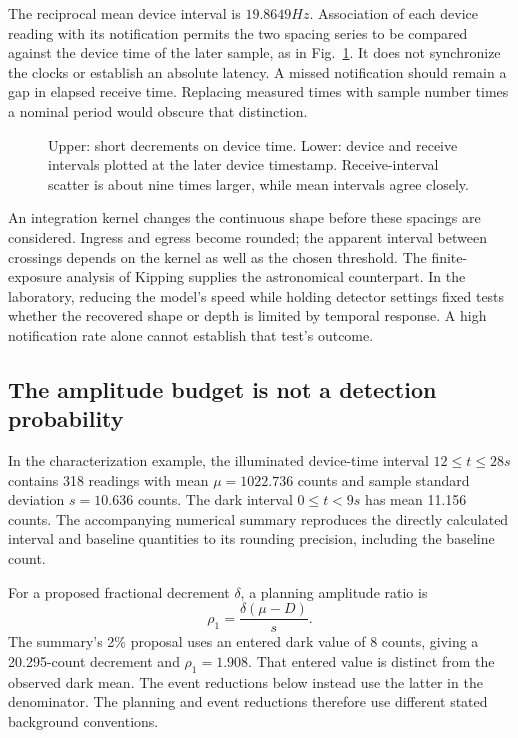 The reciprocal mean device interval is $19.8649\unit{Hz}$. Association of each device reading with its notification permits the two spacing series to be compared against the device time of the later sample, as in Fig.~\ref{fig:trc-sampling}. It does not synchronize the clocks or establish an absolute latency. A missed notification should remain a gap in elapsed receive time. Replacing measured times with sample number times a nominal period would obscure that distinction.

\begin{figure}[t]
\centering
\caption{Upper: short decrements on device time. Lower: device and receive intervals plotted at the later device timestamp. Receive-interval scatter is about nine times larger, while mean intervals agree closely.}
\label{fig:trc-sampling}
\end{figure}

An integration kernel changes the continuous shape before these spacings are considered. Ingress and egress become rounded; the apparent interval between crossings depends on the kernel as well as the chosen threshold. The finite-exposure analysis of Kipping\cite{kipping2010} supplies the astronomical counterpart. In the laboratory, reducing the model's speed while holding detector settings fixed tests whether the recovered shape or depth is limited by temporal response. A high notification rate alone cannot establish that test's outcome.

\subsection{The amplitude budget is not a detection probability}
In the characterization example, the illuminated device-time interval $12\leq t\leq28\unit{s}$ contains 318 readings with mean $\mu=1022.736$ counts and sample standard deviation $s=10.636$ counts. The dark interval $0\leq t<9\unit{s}$ has mean 11.156 counts. The accompanying numerical summary reproduces the directly calculated interval and baseline quantities to its rounding precision, including the baseline count.

For a proposed fractional decrement $\delta$, a planning amplitude ratio is
\begin{equation}
\rho_1=\frac{\delta(\mu-D)}{s}.
\label{eq:trc-snr}
\end{equation}
The summary's 2\% proposal uses an entered dark value of 8 counts, giving a 20.295-count decrement and $\rho_1=1.908$. That entered value is distinct from the observed dark mean. The event reductions below instead use the latter in the denominator. The planning and event reductions therefore use different stated background conventions.

